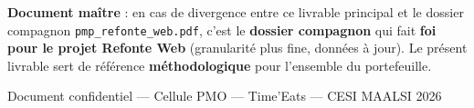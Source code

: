 \documentclass[11pt,a4paper,oneside]{report}
\begin{document}
\begin{alert}
\textbf{Document maître} : en cas de divergence entre ce livrable principal et le dossier compagnon \texttt{pmp\_refonte\_web.pdf}, c'est le \textbf{dossier compagnon} qui fait \textbf{foi pour le projet Refonte Web} (granularité plus fine, données à jour). Le présent livrable sert de référence \textbf{méthodologique} pour l'ensemble du portefeuille.
\end{alert}

\vfill
\begin{center}
\tiny\textcolor{cnSlate}{Document confidentiel --- Cellule PMO --- Time'Eats --- CESI MAALSI 2026}
\end{center}
\end{document}
